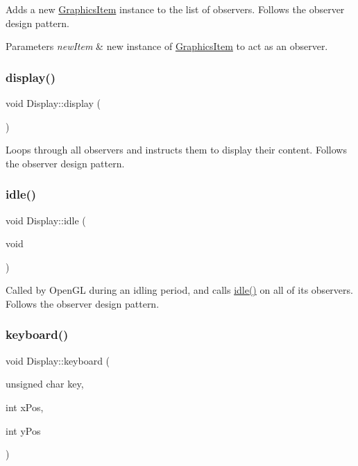 Adds a new \hyperlink{classGraphicsItem}{Graphics\+Item} instance to the list of observers. Follows the observer design pattern. 
\begin{DoxyParams}{Parameters}
{\em new\+Item} & new instance of \hyperlink{classGraphicsItem}{Graphics\+Item} to act as an observer. \\
\hline
\end{DoxyParams}
\hypertarget{classDisplay_aa3ab70ec7b76fa3ed139d19e53e72283}{}\label{classDisplay_aa3ab70ec7b76fa3ed139d19e53e72283} 
\subsubsection{\texorpdfstring{display()}{display()}}
{\ttfamily void Display\+::display (\begin{DoxyParamCaption}{ }\end{DoxyParamCaption})\hspace{0.3cm}{\ttfamily [static]}}

Loops through all observers and instructs them to display their content. Follows the observer design pattern. \hypertarget{classDisplay_aee4bd8d62d2911a938523339630a4357}{}\label{classDisplay_aee4bd8d62d2911a938523339630a4357} 
\subsubsection{\texorpdfstring{idle()}{idle()}}
{\ttfamily void Display\+::idle (\begin{DoxyParamCaption}\item[{void}]{ }\end{DoxyParamCaption})\hspace{0.3cm}{\ttfamily [static]}}

Called by Open\+GL during an idling period, and calls \hyperlink{classDisplay_aee4bd8d62d2911a938523339630a4357}{idle()} on all of its observers. Follows the observer design pattern. \hypertarget{classDisplay_a534c28d5e7287ad3e98106a6d8105e68}{}\label{classDisplay_a534c28d5e7287ad3e98106a6d8105e68} 
\subsubsection{\texorpdfstring{keyboard()}{keyboard()}}
{\ttfamily void Display\+::keyboard (\begin{DoxyParamCaption}\item[{unsigned char}]{key,  }\item[{int}]{x\+Pos,  }\item[{int}]{y\+Pos }\end{DoxyParamCaption})\hspace{0.3cm}{\ttfamily [static]}}

